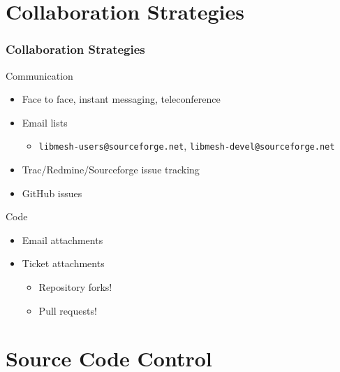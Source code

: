 \documentclass[mathserif]{beamer}
\begin{document}
\section{Collaboration Strategies}


\begin{frame}
\frametitle{Collaboration Strategies}

\begin{block}{Communication}
\begin{itemize}
	\item Face to face, instant messaging, teleconference
	\item Email lists
	\begin{itemize}
		\item \texttt{libmesh-users@sourceforge.net},
			\texttt{libmesh-devel@sourceforge.net}
	\end{itemize}
	\item Trac/Redmine/Sourceforge issue tracking
	\item GitHub issues
\end{itemize}
\end{block}

\begin{block}{Code}
\begin{itemize}
	\item Email attachments
	\item Ticket attachments
	\begin{itemize}
		\item Repository forks!
		\item Pull requests!
	\end{itemize}
\end{itemize}
\end{block}

\end{frame}



\section{Source Code Control}
\end{document}
